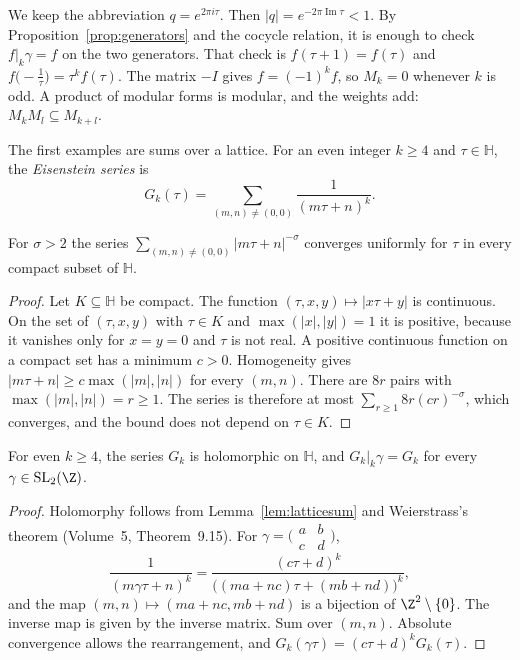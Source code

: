 We keep the abbreviation $q=e^{2\pi i\tau}$. Then $|q|=e^{-2\pi\operatorname{Im}\tau}<1$. By Proposition~\ref{prop:generators} and the cocycle relation, it is enough to check $f|_k\gamma=f$ on the two generators. That check is $f(\tau+1)=f(\tau)$ and $f\bigl(-\frac1\tau\bigr)=\tau^kf(\tau)$. The matrix $-I$ gives $f=(-1)^kf$, so $M_k=0$ whenever $k$ is odd. A product of modular forms is modular, and the weights add: $M_kM_l\subseteq M_{k+l}$.

The first examples are sums over a lattice. For an even integer $k\ge4$ and $\tau\in\mathbb H$, the \emph{Eisenstein series} is
\[
G_k(\tau)=\sum_{(m,n)\ne(0,0)}\frac1{(m\tau+n)^k}.
\]

\begin{lemma}\label{lem:latticesum}
For $\sigma>2$ the series $\sum_{(m,n)\ne(0,0)}|m\tau+n|^{-\sigma}$ converges uniformly for $\tau$ in every compact subset of $\mathbb H$.
\end{lemma}

\begin{proof}
Let $K\subseteq\mathbb H$ be compact. The function $(\tau,x,y)\mapsto|x\tau+y|$ is continuous. On the set of $(\tau,x,y)$ with $\tau\in K$ and $\max(|x|,|y|)=1$ it is positive, because it vanishes only for $x=y=0$ and $\tau$ is not real. A positive continuous function on a compact set has a minimum $c>0$. Homogeneity gives $|m\tau+n|\ge c\max(|m|,|n|)$ for every $(m,n)$. There are $8r$ pairs with $\max(|m|,|n|)=r\ge1$. The series is therefore at most $\sum_{r\ge1}8r(cr)^{-\sigma}$, which converges, and the bound does not depend on $\tau\in K$.
\end{proof}

\begin{proposition}\label{prop:eisenstein}
For even $k\ge4$, the series $G_k$ is holomorphic on $\mathbb H$, and $G_k|_k\gamma=G_k$ for every $\gamma\in\mathrm{SL}_2(\Z)$.
\end{proposition}

\begin{proof}
Holomorphy follows from Lemma~\ref{lem:latticesum} and Weierstrass's theorem (Volume~5, Theorem~9.15). For $\gamma=\bigl(\begin{smallmatrix}a&b\\c&d\end{smallmatrix}\bigr)$,
\[
\frac1{(m\gamma\tau+n)^k}=\frac{(c\tau+d)^k}{\bigl((ma+nc)\tau+(mb+nd)\bigr)^k},
\]
and the map $(m,n)\mapsto(ma+nc,mb+nd)$ is a bijection of $\Z^2\setminus\{0\}$. The inverse map is given by the inverse matrix. Sum over $(m,n)$. Absolute convergence allows the rearrangement, and $G_k(\gamma\tau)=(c\tau+d)^kG_k(\tau)$.
\end{proof}

